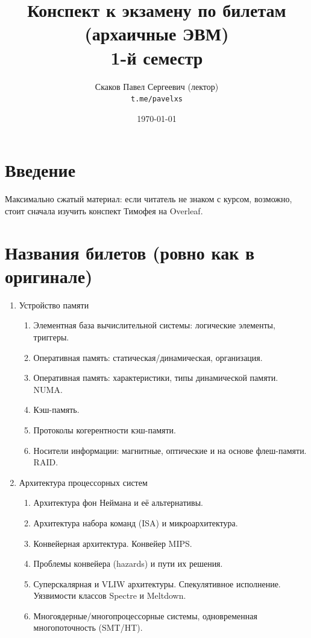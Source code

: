 \documentclass[12pt, a4paper]{article}
\title{Конспект к экзамену по билетам (архаичные ЭВМ) \\ 1-й семестр}
\author{
  \vova
  \and
  Скаков Павел Сергеевич (лектор)\\
  \texttt{t.me/pavelxs}
}
\date{\today}
\begin{document}
\maketitle
\newpage
\tableofcontents
\newpage


\section{Введение}

Максимально сжатый материал: если читатель не знаком с курсом, возможно, 
стоит сначала изучить конспект Тимофея на Overleaf.


\section{Названия билетов (ровно как в оригинале)}

\begin{enumerate}
    \item Устройство памяти
    \begin{enumerate}
        \item Элементная база вычислительной системы: логические элементы, триггеры.
        \item Оперативная память: статическая/динамическая, организация.
        \item Оперативная память: характеристики, типы динамической памяти. NUMA.
        \item Кэш-память.
        \item Протоколы когерентности кэш-памяти.
        \item Носители информации: магнитные, оптические и на основе флеш-памяти. RAID.
    \end{enumerate}
    
    
    \item Архитектура процессорных систем
    \begin{enumerate}
        \item Архитектура фон Неймана и её альтернативы.
        \item Архитектура набора команд (ISA) и микроархитектура.
        \item Конвейерная архитектура. Конвейер MIPS.
        \item Проблемы конвейера (hazards) и пути их решения.
        \item Суперскалярная и VLIW архитектуры. Спекулятивное исполнение. Уязвимости классов Spectre и Meltdown.
        \item Многоядерные/многопроцессорные системы, одновременная многопоточность (SMT/HT).
    \end{enumerate}
\end{enumerate}
\end{document}
